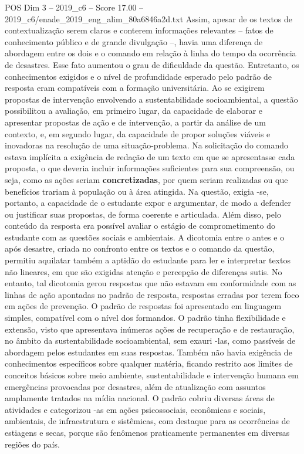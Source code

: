 \begin{textsample}{POS Dim 3 – 2019\_c6 – Score 17.00 – 2019\_c6/enade\_2019\_eng\_alim\_80a6846a2d.txt}
Assim, apesar de os textos de contextualização serem claros e conterem informações relevantes – fatos de conhecimento público e de grande divulgação –, havia uma diferença de abordagem entre os dois e o comando em relação à linha do tempo da ocorrência de desastres.
Esse fato aumentou o grau de dificuldade da questão.
Entretanto, os conhecimentos exigidos e o nível de profundidade esperado pelo padrão de resposta eram compatíveis com a formação universitária.
Ao se exigirem propostas de intervenção envolvendo a sustentabilidade socioambiental, a questão possibilitou a avaliação, em primeiro lugar, da capacidade de elaborar e apresentar propostas de ação e de intervenção, a partir da análise de um contexto, e, em segundo lugar, da capacidade de propor soluções viáveis e inovadoras na resolução de uma situação-problema.
Na solicitação do comando estava implícita a exigência de redação de um texto em que se apresentasse cada proposta, o que deveria incluir informações suficientes para sua compreensão, ou seja, como as ações seriam \textbf{concretizadas}, por quem seriam realizadas ou que benefícios trariam à população ou à área atingida.
Na questão, exigia -se, portanto, a capacidade de o estudante expor e argumentar, de modo a defender ou justificar suas propostas, de forma coerente e articulada.
Além disso, pelo conteúdo da resposta era possível avaliar o estágio de comprometimento do estudante com as questões sociais e ambientais.
A dicotomia entre o antes e o após desastre, criada no confronto entre os textos e o comando da questão, permitiu aquilatar também a aptidão do estudante para ler e interpretar textos não lineares, em que são exigidas atenção e percepção de diferenças sutis.
No entanto, tal dicotomia gerou respostas que não estavam em conformidade com as linhas de ação apontadas no padrão de resposta, respostas erradas por terem foco em ações de prevenção.
O padrão de respostas foi apresentado em linguagem simples, compatível com o nível dos formandos.
O padrão tinha flexibilidade e extensão, visto que apresentava inúmeras ações de recuperação e de restauração, no âmbito da sustentabilidade socioambiental, sem exauri -las, como passíveis de abordagem pelos estudantes em suas respostas.
Também não havia exigência de conhecimentos específicos sobre qualquer matéria, ficando restrito aos limites de conceitos básicos sobre meio ambiente, sustentabilidade e intervenção humana em emergências provocadas por desastres, além de atualização com assuntos amplamente tratados na mídia nacional.
O padrão cobriu diversas áreas de atividades e categorizou -as em ações psicossociais, econômicas e sociais, ambientais, de infraestrutura e sistêmicas, com destaque para as ocorrências de estiagens e secas, porque são fenômenos praticamente permanentes em diversas regiões do país.

\end{textsample}
